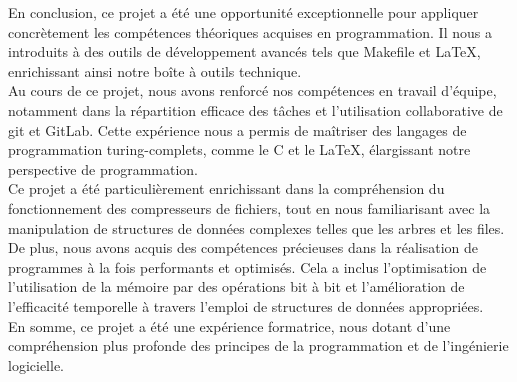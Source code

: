 En conclusion, ce projet a été une opportunité exceptionnelle pour appliquer concrètement les compétences théoriques acquises en programmation. Il nous a introduits à des outils de développement avancés tels que Makefile et LaTeX, enrichissant ainsi notre boîte à outils technique.
\\
Au cours de ce projet, nous avons renforcé nos compétences en travail d'équipe, notamment dans la répartition efficace des tâches et l'utilisation collaborative de git et GitLab. Cette expérience nous a permis de maîtriser des langages de programmation turing-complets, comme le C et le LaTeX, élargissant notre perspective de programmation.
\\
Ce projet a été particulièrement enrichissant dans la compréhension du fonctionnement des compresseurs de fichiers, tout en nous familiarisant avec la manipulation de structures de données complexes telles que les arbres et les files. De plus, nous avons acquis des compétences précieuses dans la réalisation de programmes à la fois performants et optimisés. Cela a inclus l'optimisation de l'utilisation de la mémoire par des opérations bit à bit et l'amélioration de l'efficacité temporelle à travers l'emploi de structures de données appropriées.
\\
En somme, ce projet a été une expérience formatrice, nous dotant d'une compréhension plus profonde des principes de la programmation et de l'ingénierie logicielle.
